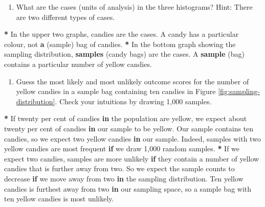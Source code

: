\documentclass[a4paper]{book}
\newenvironment{Shaded}{\begin{snugshade}}{\end{snugshade}}
\newcommand{\KeywordTok}[1]{\textcolor[rgb]{0,0,0}{\textbf{#1}}}
\newcommand{\DecValTok}[1]{\textcolor[rgb]{0.00,0.00,0.00}{#1}}
\newcommand{\StringTok}[1]{\textcolor[rgb]{0.00,0.00,0.00}{#1}}
\newcommand{\ControlFlowTok}[1]{\textcolor[rgb]{0.00,0.00,0.00}{\textbf{#1}}}
\newcommand{\OperatorTok}[1]{\textcolor[rgb]{0.00,0.00,0.00}{\textbf{#1}}}
\newcommand{\NormalTok}[1]{#1}
\providecommand{\tightlist}{%
  \setlength{\itemsep}{0pt}\setlength{\parskip}{0pt}}
\theoremstyle{definition}
\theoremstyle{definition}
\theoremstyle{definition}
\theoremstyle{remark}
\begin{document}
\begin{enumerate}
\def\labelenumi{\arabic{enumi}.}
\setcounter{enumi}{1}
\tightlist
\item
  What are the cases (units of analysis) in the three histograms? Hint:
  There are two different types of cases.
\end{enumerate}

\begin{Shaded}
\begin{Highlighting}[]
\OperatorTok{*}\StringTok{ }\NormalTok{In the upper two graphs, candies are the cases. A candy has a particular}
\NormalTok{colour, not }\KeywordTok{a}\NormalTok{ (sample) bag of candies.}
\OperatorTok{*}\StringTok{ }\NormalTok{In the bottom graph showing the sampling distribution, }\KeywordTok{samples}\NormalTok{ (candy bags)}
\NormalTok{are the cases. A }\KeywordTok{sample}\NormalTok{ (bag) contains a particular number of yellow candies.}
\end{Highlighting}
\end{Shaded}

\begin{enumerate}
\def\labelenumi{\arabic{enumi}.}
\setcounter{enumi}{2}
\tightlist
\item
  Guess the most likely and most unlikely outcome scores for the number
  of yellow candies in a sample bag containing ten candies in Figure
  \ref{fig:sampling-distribution}. Check your intuitions by drawing
  1,000 samples.
\end{enumerate}

\begin{Shaded}
\begin{Highlighting}[]
\OperatorTok{*}\StringTok{ }\NormalTok{If twenty per cent of candies }\ControlFlowTok{in}\NormalTok{ the population are yellow, we expect about}
\NormalTok{twenty per cent of candies }\ControlFlowTok{in}\NormalTok{ our sample to be yellow. Our sample contains ten}
\NormalTok{candies, so we expect two yellow candies }\ControlFlowTok{in}\NormalTok{ our sample. Indeed, samples with}
\NormalTok{two yellow candies are most frequent }\ControlFlowTok{if}\NormalTok{ we draw }\DecValTok{1}\NormalTok{,}\DecValTok{000}\NormalTok{ random samples.}
\OperatorTok{*}\StringTok{ }\NormalTok{If we expect two candies, samples are more unlikely }\ControlFlowTok{if}\NormalTok{ they contain a number}
\NormalTok{of yellow candies that is further away from two. So we expect the sample}
\NormalTok{counts to decrease }\ControlFlowTok{if}\NormalTok{ we move away from two }\ControlFlowTok{in}\NormalTok{ the sampling distribution. Ten}
\NormalTok{yellow candies is furthest away from two }\ControlFlowTok{in}\NormalTok{ our sampling space, so a sample}
\NormalTok{bag with ten yellow candies is most unlikely.}
\end{Highlighting}
\end{Shaded}
\end{document}

